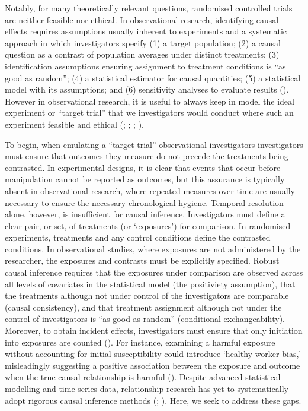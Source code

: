 \documentclass[
  single column]{article}
\begin{document}
Notably, for many theoretically relevant questions, randomised
controlled trials are neither feasible nor ethical. In observational
research, identifying causal effects requires assumptions usually
inherent to experiments and a systematic approach in which investigators
specify (1) a target population; (2) a causal question as a contrast of
population averages under distinct treatments; (3) identification
assumptions ensuring assignment to treatment conditions is ``as good as
random''; (4) a statistical estimator for causal quantities; (5) a
statistical model with its assumptions; and (6) sensitivity analyses to
evaluate results ().
However in observational research, it is useful to always keep in model
the ideal experiment or ``target trial'' that we investigators would
conduct where such an experiment feasible and ethical
(;
;
;
).

To begin, when emulating a ``target trial'' observational investigators
investigators must ensure that outcomes they measure do not precede the
treatments being contrasted. In experimental designs, it is clear that
events that occur before manipulation cannot be reported as outcomes,
but this assurance is typically absent in observational research, where
repeated measures over time are usually necessary to ensure the
necessary chronological hygiene. Temporal resolution alone, however, is
insufficient for causal inference. Investigators must define a clear
pair, or set, of treatments (or `exposures') for comparison. In
randomised experiments, treatments and any control conditions define the
contrasted conditions. In observational studies, where exposures are not
administered by the researcher, the exposures and contrasts must be
explicitly specified. Robust causal inference requires that the
exposures under comparison are observed across all levels of covariates
in the statistical model (the positiviety assumption), that the
treatments although not under control of the investigators are
comparable (causal consistency), and that treatment assignment although
not under the control of investigators is ``as good as random''
(conditional exchangeability). Moreover, to obtain incident effects,
investigators must ensure that only initiation into exposures are
counted (). For
instance, examining a harmful exposure without accounting for initial
susceptibility could introduce `healthy-worker bias,' misleadingly
suggesting a positive association between the exposure and outcome when
the true causal relationship is harmful
(). Despite advanced statistical
modelling and time series data, relationship research has yet to
systematically adopt rigorous causal inference methods
(;
). Here,
we seek to address these gaps.
\end{document}
